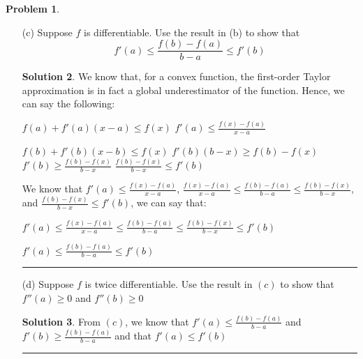 \documentclass{article}
\theoremstyle{definition}
\newtheorem{problem}{Problem}
\def\fline{\rule{0.75\linewidth}{0.5pt}}
\newcommand{\finishline}{\begin{center}\fline\end{center}}
\newtheorem*{solution*}{Solution}
\newenvironment{solution}{\begin{solution*}}{{\finishline} \end{solution*}}
\begin{document}
\begin{problem}
\begin{enumerate}
\begin{solution}
                    \end{solution}
        \item[(c)] Suppose $f$ is differentiable. Use the result in (b) to show that 
        \begin{equation}
                        \label{eq:example}
                            f'(a) \leq  \frac{f(b) - f(a)}{b - a} \leq f'(b)
                    \end{equation}

                \begin{solution}
                    We know that, for a convex function, the first-order Taylor approximation is in fact a global underestimator of the function. Hence, we can say the following: \newline 

                    $f(a) + f'(a) (x - a) \leq f(x)$ \newline 
                    $f'(a) \leq \frac{f(x) - f(a)}{x - a}$ \newline 

                    $f(b) + f'(b) (x - b) \leq f(x)$ \newline 
                    $f'(b) (b - x) \geq f(b) - f(x)$ \newline 
                    $f'(b) \geq \frac{f(b) - f(x)}{b - x}$ \newline
                    $\frac{f(b) - f(x)}{b - x} \leq f'(b)$ \newline


                    We know that $f'(a) \leq \frac{f(x) - f(a)}{x - a}$, $\frac{f(x) - f(a)}{x - a}  \leq \frac{f(b) - f(a)}{b - a} \leq \frac{f(b) - f(x)}{b - x}$, and $\frac{f(b) - f(x)}{b - x} \leq f'(b)$, we can say that: \newline 

                    $f'(a) \leq \frac{f(x) - f(a)}{x - a}  \leq \frac{f(b) - f(a)}{b - a} \leq \frac{f(b) - f(x)}{b - x} \leq f'(b)$ \newline 

                    $f'(a) \leq \frac{f(b) - f(a)}{b - a} \leq  f'(b)$ \newline 
                \end{solution}

        \item[(d)] Suppose $f$ is twice differentiable. Use the result in $(c)$ to show that $f''(a) \geq 0$ and $f''(b) \geq 0$

            \begin{solution}
                From $(c)$, we know that $f'(a) \leq \frac{f(b) - f(a)}{b - a}$ and $f'(b) \geq \frac{f(b) - f(a)}{b - a}$ and that $f'(a) \leq f'(b)$ \newline 


\end{solution}
\end{enumerate}
\end{problem}
\end{document}
